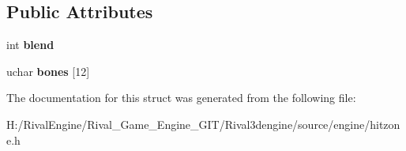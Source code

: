 \subsection*{Public Attributes}
\begin{DoxyCompactItemize}
\item 
\mbox{\label{structskelzonekey_a7b0a8cadfc46d826b9991c2188d966d2}} 
int {\bfseries blend}
\item 
\mbox{\label{structskelzonekey_a5028b54f7a031edcd4228ac95b2c3da9}} 
uchar {\bfseries bones} \mbox{[}12\mbox{]}
\end{DoxyCompactItemize}


The documentation for this struct was generated from the following file\+:\begin{DoxyCompactItemize}
\item 
H\+:/\+Rival\+Engine/\+Rival\+\_\+\+Game\+\_\+\+Engine\+\_\+\+G\+I\+T/\+Rival3dengine/source/engine/hitzone.\+h\end{DoxyCompactItemize}
